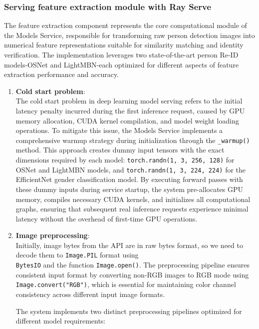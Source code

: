 \subsubsection{Serving feature extraction module with Ray Serve}

The feature extraction component represents the core computational module of the Models Service, responsible for transforming raw person detection images into numerical feature representations suitable for similarity matching and identity verification. The implementation leverages two state-of-the-art person Re-ID models-OSNet and LightMBN-each optimized for different aspects of feature extraction performance and accuracy.

\begin{enumerate}
    \item \textbf{Cold start problem}:\\
    The cold start problem in deep learning model serving refers to the initial latency penalty incurred during the first inference request, caused by GPU memory allocation, CUDA kernel compilation, and model weight loading operations. To mitigate this issue, the Models Service implements a comprehensive warmup strategy during initialization through the \texttt{\_warmup()} method. This approach creates dummy input tensors with the exact dimensions required by each model: \texttt{torch.randn(1, 3, 256, 128)} for OSNet and LightMBN models, and \texttt{torch.randn(1, 3, 224, 224)} for the EfficientNet gender classification model. By executing forward passes with these dummy inputs during service startup, the system pre-allocates GPU memory, compiles necessary CUDA kernels, and initializes all computational graphs, ensuring that subsequent real inference requests experience minimal latency without the overhead of first-time GPU operations.
    
    \item \textbf{Image preprocessing}:\\
    Initially, image bytes from the API are in raw bytes format, so we need to decode them to \texttt{Image.PIL} format using \\ \texttt{BytesIO} and the function \texttt{Image.open()}. The preprocessing pipeline ensures consistent input format by converting non-RGB images to RGB mode using \texttt{Image.convert("RGB")}, which is essential for maintaining color channel consistency across different input image formats.

    The system implements two distinct preprocessing pipelines optimized for different model requirements:
    

\end{enumerate}
